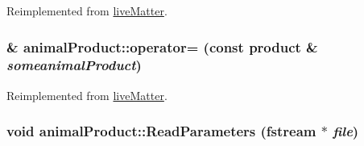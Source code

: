 Reimplemented from \hyperlink{classlive_matter_a6b8311a516ba78a7caacc80a28ec143e}{liveMatter}.\hypertarget{classanimal_product_a4d2a737f963def9fec349b7f49e85d7c}{
\subsubsection[{operator=}]{ \& animalProduct::operator= (const {\bf product} \& {\em someanimalProduct})}}
\label{classanimal_product_a4d2a737f963def9fec349b7f49e85d7c}


Reimplemented from \hyperlink{classlive_matter_a3b1eb79d0f248a4459874db44c335cac}{liveMatter}.\hypertarget{classanimal_product_a5fb92897386b34edf51415f88806dd03}{
\subsubsection[{ReadParameters}]{\setlength{\rightskip}{0pt plus 5cm}void animalProduct::ReadParameters (fstream $\ast$ {\em file})}}
\label{classanimal_product_a5fb92897386b34edf51415f88806dd03}


